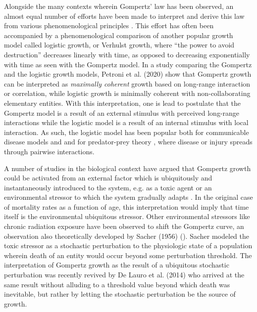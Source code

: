 \documentclass{article}
\begin{document}
Alongside the many contexts wherein Gompertz' law has been observed, an almost equal number of efforts have been made to interpret and derive this law from various phenomenological principles \cite{bajzer1997mathematical}. This effort has often been accompanied by a phenomenological comparison of another popular growth model called logistic growth, or Verhulst growth, where ``the power to avoid destruction'' decreases linearly with time, as opposed to decreasing exponentially with time as seen with the Gompertz model. In a study comparing the Gompertz and the logistic growth models, Petroni et al. (2020) \cite{petroni2020logistic} show that Gompertz growth can be interpreted as \textit{maximally coherent} growth based on long-range interaction or correlation, while logistic growth is minimally coherent with non-collaborating elementary entities. With this interpretation, one is lead to postulate that the Gompertz model is a result of an external stimulus with perceived long-range interactions while the logistic model is a result of an internal stimulus with local interaction. As such, the logistic model has been popular both for communicable disease models \cite{harko2014exact,kroger2020analytical,schlickeiser2021analytical,heng2020approximately} and and for predator-prey theory \cite{berryman1992orgins}, where disease or injury spreads through pairwise interactions. 

A number of studies in the biological context have argued that Gompertz growth could be activated from an external factor which is ubiquitously and instantaneously introduced to the system, e.g. as a toxic agent or an environmental stressor to which the system gradually adapts \cite{neafsey1988gompertz,neafsey1989gompertz,thompson1990biphasic}. In the original case of mortality rates as a function of age, this interpretation would imply that time itself is the environmental ubiquitous stressor. Other environmental stressors like chronic radiation exposure have been observed to shift the Gompertz curve, an observation also theoretically developed by Sacher (1956) (\cite{sacher1956statistical}). Sacher modeled the toxic stressor as a stochastic perturbation to the physiologic state of a population wherein death of an entity would occur beyond some perturbation threshold. The interpretation of Gompertz growth as the result of a ubiquitous stochastic perturbation was recently revived by De Lauro et al. (2014) \cite{de2014stochastic} who arrived at the same result without alluding to a threshold value beyond which death was inevitable, but rather by letting the stochastic perturbation be the source of growth.
\end{document}
